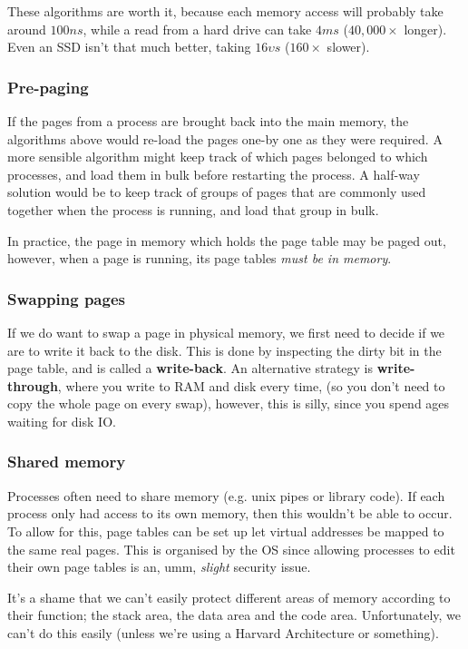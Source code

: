 These algorithms are worth it, because each memory access will probably take
around $100ns$, while a read from a hard drive can take $4ms$ ($40,000 \times$
longer). Even an SSD isn't that much better, taking $16\upsilon s$ ($160 \times$
slower).

\subsubsection{Pre-paging}

If the pages from a process are brought back into the main memory, the
algorithms above would re-load the pages one-by one as they were required. A
more sensible algorithm might keep track of which pages belonged to which
processes, and load them in bulk before restarting the process. A half-way
solution would be to keep track of groups of pages that are commonly used
together when the process is running, and load that group in bulk.

In practice, the page in memory which holds the page table may be paged out,
however, when a page is running, its page tables \textit{must be in memory}.

\subsubsection{Swapping pages}

If we do want to swap a page in physical memory, we first need to decide if we
are to write it back to the disk. This is done by inspecting the dirty bit in
the page table, and is called a \textbf{write-back}. An alternative strategy is
\textbf{write-through}, where you write to RAM and disk every time, (so you
don't need to copy the whole page on every swap), however, this is silly, since
you spend ages waiting for disk IO.

\subsubsection{Shared memory}

Processes often need to share memory (e.g. unix pipes or library code). If each
process only had access to its own memory, then this wouldn't be able to occur.
To allow for this, page tables can be set up let virtual addresses be mapped to
the same real pages. This is organised by the OS since allowing processes to
edit their own page tables is an, umm, \textit{slight} security issue.

It's a shame that we can't easily protect different areas of memory according to
their function; the stack area, the data area and the code area. Unfortunately,
we can't do this easily (unless we're using a Harvard Architecture or
something).

